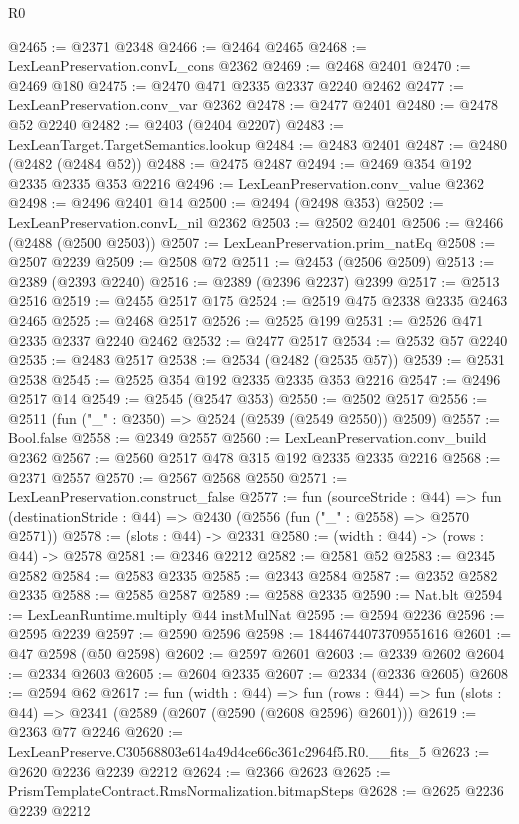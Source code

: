 \begin{lexlean}{R0}
\begin{coremodule}
@2465 := @2371 @2348
@2466 := @2464 @2465
@2468 := LexLeanPreservation.convL_cons @2362
@2469 := @2468 @2401
@2470 := @2469 @180
@2475 := @2470 @471 @2335 @2337 @2240 @2462
@2477 := LexLeanPreservation.conv_var @2362
@2478 := @2477 @2401
@2480 := @2478 @52 @2240
@2482 := @2403 (@2404 @2207)
@2483 := LexLeanTarget.TargetSemantics.lookup
@2484 := @2483 @2401
@2487 := @2480 (@2482 (@2484 @52))
@2488 := @2475 @2487
@2494 := @2469 @354 @192 @2335 @2335 @353 @2216
@2496 := LexLeanPreservation.conv_value @2362
@2498 := @2496 @2401 @14
@2500 := @2494 (@2498 @353)
@2502 := LexLeanPreservation.convL_nil @2362
@2503 := @2502 @2401
@2506 := @2466 (@2488 (@2500 @2503))
@2507 := LexLeanPreservation.prim_natEq
@2508 := @2507 @2239
@2509 := @2508 @72
@2511 := @2453 (@2506 @2509)
@2513 := @2389 (@2393 @2240)
@2516 := @2389 (@2396 @2237) @2399
@2517 := @2513 @2516
@2519 := @2455 @2517 @175
@2524 := @2519 @475 @2338 @2335 @2463 @2465
@2525 := @2468 @2517
@2526 := @2525 @199
@2531 := @2526 @471 @2335 @2337 @2240 @2462
@2532 := @2477 @2517
@2534 := @2532 @57 @2240
@2535 := @2483 @2517
@2538 := @2534 (@2482 (@2535 @57))
@2539 := @2531 @2538
@2545 := @2525 @354 @192 @2335 @2335 @353 @2216
@2547 := @2496 @2517 @14
@2549 := @2545 (@2547 @353)
@2550 := @2502 @2517
@2556 := @2511 (fun ("_" : @2350) => @2524 (@2539 (@2549 @2550)) @2509)
@2557 := Bool.false
@2558 := @2349 @2557
@2560 := LexLeanPreservation.conv_build @2362
@2567 := @2560 @2517 @478 @315 @192 @2335 @2335 @2216
@2568 := @2371 @2557
@2570 := @2567 @2568 @2550
@2571 := LexLeanPreservation.construct_false
@2577 := fun (sourceStride : @44) =>
  fun (destinationStride : @44) => @2430 (@2556 (fun ("_" : @2558) => @2570 @2571))
@2578 := (slots : @44) -> @2331
@2580 := (width : @44) -> (rows : @44) -> @2578
@2581 := @2346 @2212
@2582 := @2581 @52
@2583 := @2345 @2582
@2584 := @2583 @2335
@2585 := @2343 @2584
@2587 := @2352 @2582 @2335
@2588 := @2585 @2587
@2589 := @2588 @2335
@2590 := Nat.blt
@2594 := LexLeanRuntime.multiply @44 instMulNat
@2595 := @2594 @2236
@2596 := @2595 @2239
@2597 := @2590 @2596
@2598 := 18446744073709551616
@2601 := @47 @2598 (@50 @2598)
@2602 := @2597 @2601
@2603 := @2339 @2602
@2604 := @2334 @2603
@2605 := @2604 @2335
@2607 := @2334 (@2336 @2605)
@2608 := @2594 @62
@2617 := fun (width : @44) =>
  fun (rows : @44) => fun (slots : @44) => @2341 (@2589 (@2607 (@2590 (@2608 @2596) @2601)))
@2619 := @2363 @77 @2246
@2620 := LexLeanPreserve.C30568803e614a49d4ce66c361c2964f5.R0.__fits_5
@2623 := @2620 @2236 @2239 @2212
@2624 := @2366 @2623
@2625 := PrismTemplateContract.RmsNormalization.bitmapSteps
@2628 := @2625 @2236 @2239 @2212

\end{coremodule}
\end{lexlean}
